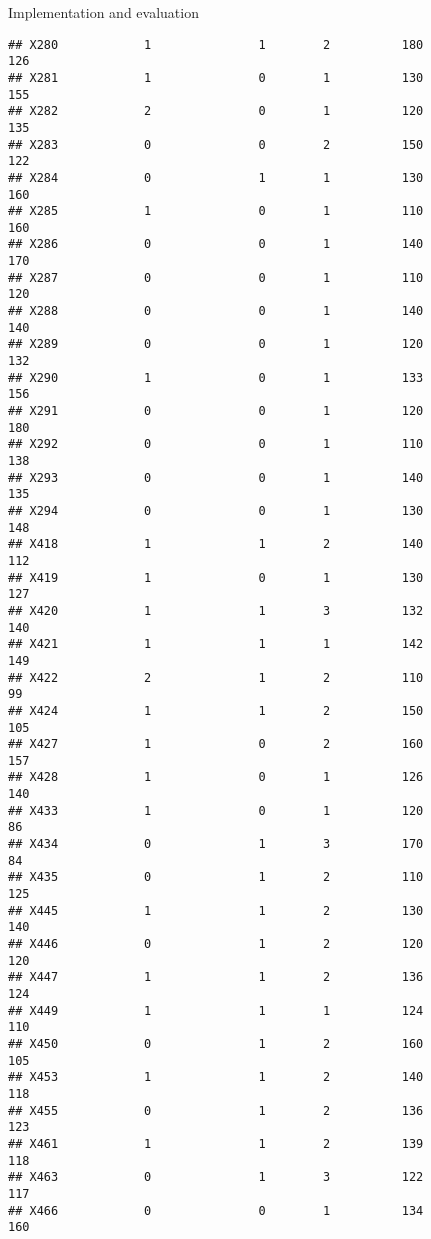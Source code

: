 \documentclass[
  ignorenonframetext,
]{beamer}
\begin{document}
\begin{frame}[fragile]{Implementation and evaluation}
\begin{verbatim}
## X280            1               1        2          180            126
## X281            1               0        1          130            155
## X282            2               0        1          120            135
## X283            0               0        2          150            122
## X284            0               1        1          130            160
## X285            1               0        1          110            160
## X286            0               0        1          140            170
## X287            0               0        1          110            120
## X288            0               0        1          140            140
## X289            0               0        1          120            132
## X290            1               0        1          133            156
## X291            0               0        1          120            180
## X292            0               0        1          110            138
## X293            0               0        1          140            135
## X294            0               0        1          130            148
## X418            1               1        2          140            112
## X419            1               0        1          130            127
## X420            1               1        3          132            140
## X421            1               1        1          142            149
## X422            2               1        2          110             99
## X424            1               1        2          150            105
## X427            1               0        2          160            157
## X428            1               0        1          126            140
## X433            1               0        1          120             86
## X434            0               1        3          170             84
## X435            0               1        2          110            125
## X445            1               1        2          130            140
## X446            0               1        2          120            120
## X447            1               1        2          136            124
## X449            1               1        1          124            110
## X450            0               1        2          160            105
## X453            1               1        2          140            118
## X455            0               1        2          136            123
## X461            1               1        2          139            118
## X463            0               1        3          122            117
## X466            0               0        1          134            160

\end{verbatim}
\end{frame}
\end{document}
